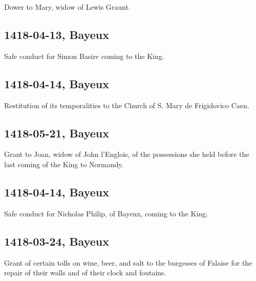 \documentclass[a4paper,12pt,twoside]{book}
\begin{document}
                
                     Dower to Mary, widow of Lewis Graunt.
                  
                
                \subsection{1418-04-13, Bayeux}
                
                
                     Safe conduct for Simon Basire coming to the King.
                  
                
                \subsection{1418-04-14, Bayeux}
                
                
                     Restitution of its temporalities to the Church of S. Mary de Frigidovico Caen.
                  
                
                \subsection{1418-05-21, Bayeux}
                
                
                     Grant to Joan, widow of John l'Englois, of the possessions she held before the last coming of the King to Normandy.
                  
                
                \subsection{1418-04-14, Bayeux}
                
                
                     Safe conduct for Nicholas Philip, of Bayeux, coming to the King.
                  
                
                \subsection{1418-03-24, Bayeux}
                
                
                     Grant of certain tolls on wine, beer, and salt to the burgesses of Falaise for the repair of their walls and of their clock and foutains.
                  
\end{document}
